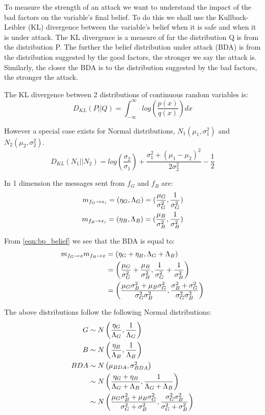 To measure the strength of an attack we want to understand the impact of the bad factors on the variable's final belief. To do this we shall use the Kullback-Leibler (KL) divergence \citationneeded between the variable's belief when it is safe and when it is under attack.
The KL divergence is a measure of far the distribution Q is from the distribution P. The further the belief distribution under attack (BDA) is from the distribution suggested by the good factors, the stronger we say the attack is. Similarly, the closer the BDA is to the distribution suggested by the bad factors, the stronger the attack.

The KL divergence between 2 distributions of continuous random variables is:
\begin{equation}
	D_{KL}(P || Q) = \int_{-\infty}^{\infty} log\left( \frac{p(x)}{q(x)} \right) dx
\end{equation}

However a special case exists for Normal distributions, $N_1(\mu_1, \sigma_1^2)$ and $N_2(\mu_2, \sigma_2^2)$.
\begin{equation}
	D_{KL}(N_1 || N_2) = log\left(\frac{\sigma_2}{\sigma_1}\right) + \frac{\sigma_1^2 + (\mu_1 - \mu_2)^2}{2\sigma_2^2} - \frac{1}{2}
\end{equation}

In 1 dimension the messages sent from $f_G$ and $f_B$ are:
\begin{eqnarray}
	m_{f_G \rightarrow x_i} = (\eta_G, \Lambda_G) = (\frac{\mu_G}{\sigma_G^2}, \frac{1}{\sigma_G^2})\\
	m_{f_B \rightarrow x_i} = (\eta_B, \Lambda_B) = (\frac{\mu_B}{\sigma_B^2}, \frac{1}{\sigma_B^2}) \label{eqn:attacker_msg}
\end{eqnarray}

From \ref{eqn:bp_belief} we see that the BDA is equal to:
\begin{align}
	m_{f_G \rightarrow x} m_{f_B \rightarrow x} 
	&= (\eta_G + \eta_B, \Lambda_G + \Lambda_B)\\
	&= \left(\frac{\mu_G}{\sigma_G^2} + \frac{\mu_B}{\sigma_B^2}, \frac{1}{\sigma_G^2} + \frac{1}{\sigma_B^2}\right)\\
	&= \left(\frac{\mu_G\sigma_B^2 + \mu_B\sigma_G^2}{\sigma_G^2 \sigma_B^2}, \frac{\sigma_B^2 + \sigma_G^2}{\sigma_G^2 \sigma_B^2}\right)
\end{align}

The above distributions follow the following Normal distributions:
\begin{align}
	G &\sim N\left(\frac{\eta_G}{\Lambda_G}, \frac{1}{\Lambda_G}\right)\\
	B &\sim N\left(\frac{\eta_B}{\Lambda_B}, \frac{1}{\Lambda_B}\right)\\
	BDA &\sim N\left(\mu_{BDA}, \sigma_{BDA}^2\right)\\
	&\sim N\left(\frac{\eta_G + \eta_B}{\Lambda_G + \Lambda_B}, \frac{1}{\Lambda_G + \Lambda_B}\right)\\
	&\sim N\left(\frac{\mu_G\sigma_B^2 + \mu_B\sigma_G^2}{\sigma_G^2 + \sigma_B^2}, \frac{\sigma_G^2 \sigma_B^2}{\sigma_G^2 + \sigma_B^2}\right) \label{eqn:bda_distribution}
\end{align}


